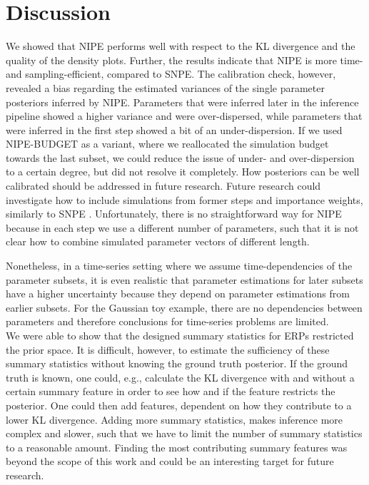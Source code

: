 \documentclass[12pt]{extreport}
\begin{document}
\chapter{Discussion}



We showed that NIPE performs well with respect to the KL divergence and the quality of the density plots. Further, the results indicate that NIPE is more time- and sampling-efficient, compared to SNPE. The calibration check, however, revealed a bias regarding the estimated variances of the single parameter posteriors inferred by NIPE. Parameters that were inferred later in the inference pipeline showed a higher variance and were over-dispersed, while parameters that were inferred in the first step showed a bit of an under-dispersion. If we used NIPE-BUDGET as a variant, where we reallocated the simulation budget towards the last subset, we could reduce the issue of under- and over-dispersion to a certain degree, but did not resolve it completely. How posteriors can be well calibrated should be addressed in future research. Future research could investigate how to include simulations from former steps and importance weights, similarly to SNPE \citep{greenberg_automatic_2019}. Unfortunately, there is no straightforward way for NIPE because in each step we use a different number of parameters, such that it is not clear how to combine simulated parameter vectors of different length. 

Nonetheless, in a time-series setting where we assume time-dependencies of the parameter subsets, it is even realistic that parameter estimations for later subsets have a higher uncertainty because they depend on parameter estimations from earlier subsets. For the Gaussian toy example, there are no dependencies between parameters and therefore conclusions for time-series problems are limited.  \\




We were able to show that the designed summary statistics for ERPs restricted the prior space. It is difficult, however, to estimate the sufficiency of these summary statistics without knowing the ground truth posterior. If the ground truth is known, one could, e.g., calculate the KL divergence with and without a certain summary feature in order to see how and if the feature restricts the posterior. One could then add features, dependent on how they contribute to a lower KL divergence. Adding more summary statistics, makes inference more complex and slower, such that we have to limit the number of summary statistics to a reasonable amount. Finding the most contributing summary features was beyond the scope of this work and could be an interesting target for future research.\\
\end{document}
